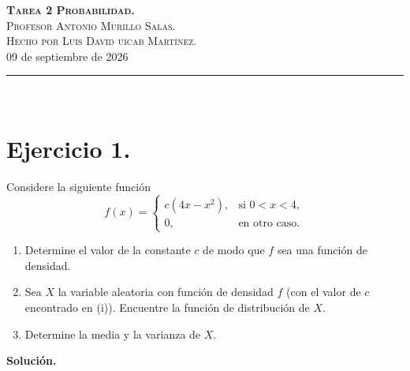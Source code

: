 \documentclass[12pt,a4paper]{article}
\theoremstyle{plain}
\theoremstyle{definition}
\theoremstyle{remark}
\begin{document}
\textsc{\textbf{Tarea 2 Probabilidad.}}\\
    \textsc {Profesor Antonio Murillo Salas.\\
    Hecho por Luis David uicab Martínez.\\}
    09 de septiembre de 2026\\
    \rule{15cm}{4pt}\\[0.3cm]
    
\section*{Ejercicio 1.}
Considere la siguiente función
\[
f(x) =
\begin{cases}
    c(4x - x^2), & \text{si } 0 < x < 4,\\
    0, & \text{en otro caso}.
\end{cases}
\]
\begin{enumerate}
    \item[(i)] Determine el valor de la constante $c$ de modo que $f$ sea una función de densidad.
    \item[(ii)] Sea $X$ la variable aleatoria con función de densidad $f$ (con el valor de $c$ encontrado en (i)). Encuentre la función de distribución de $X$.
    \item[(iii)] Determine la media y la varianza de $X$.
\end{enumerate}
\textbf{Solución.}
\end{document}
